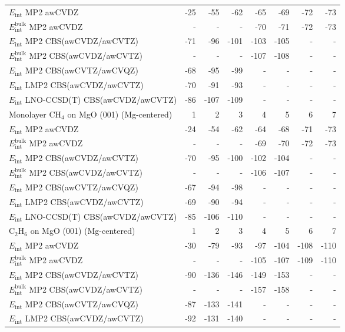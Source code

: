 \begin{longtable}{lrrrrrrr}
$E_\textrm{int}$ MP2 awCVDZ & -25 & -55 & -62 & -65 & -69 & -72 & -73 \\
$E_\textrm{int}^\textrm{bulk}$ MP2 awCVDZ & - & - & - & -70 & -71 & -72 & -73 \\
$E_\textrm{int}$ MP2 CBS(awCVDZ/awCVTZ) & -71 & -96 & -101 & -103 & -105 & - & - \\
$E_\textrm{int}^\textrm{bulk}$ MP2 CBS(awCVDZ/awCVTZ) & - & - & - & -107 & -108 & - & - \\
$E_\textrm{int}$ MP2 CBS(awCVTZ/awCVQZ) & -68 & -95 & -99 & - & - & - & - \\
$E_\textrm{int}$ LMP2 CBS(awCVDZ/awCVTZ) & -70 & -91 & -93 & - & - & - & - \\
$E_\textrm{int}$ LNO-CCSD(T) CBS(awCVDZ/awCVTZ) & -86 & -107 & -109 & - & - & - & - \\
\toprule
Monolayer CH$_4$ on MgO (001) (Mg-centered) & 1 & 2 & 3 & 4 & 5 & 6 & 7 \\ 
\midrule
$E_\textrm{int}$ MP2 awCVDZ & -24 & -54 & -62 & -64 & -68 & -71 & -73 \\
$E_\textrm{int}^\textrm{bulk}$ MP2 awCVDZ & - & - & - & -69 & -70 & -72 & -73 \\
$E_\textrm{int}$ MP2 CBS(awCVDZ/awCVTZ) & -70 & -95 & -100 & -102 & -104 & - & - \\
$E_\textrm{int}^\textrm{bulk}$ MP2 CBS(awCVDZ/awCVTZ) & - & - & - & -106 & -107 & - & - \\
$E_\textrm{int}$ MP2 CBS(awCVTZ/awCVQZ) & -67 & -94 & -98 & - & - & - & - \\
$E_\textrm{int}$ LMP2 CBS(awCVDZ/awCVTZ) & -69 & -90 & -94 & - & - & - & - \\
$E_\textrm{int}$ LNO-CCSD(T) CBS(awCVDZ/awCVTZ) & -85 & -106 & -110 & - & - & - & - \\
\toprule
C$_2$H$_6$ on MgO (001) (Mg-centered) & 1 & 2 & 3 & 4 & 5 & 6 & 7 \\ 
\midrule
$E_\textrm{int}$ MP2 awCVDZ & -30 & -79 & -93 & -97 & -104 & -108 & -110 \\
$E_\textrm{int}^\textrm{bulk}$ MP2 awCVDZ & - & - & - & -105 & -107 & -109 & -110 \\
$E_\textrm{int}$ MP2 CBS(awCVDZ/awCVTZ) & -90 & -136 & -146 & -149 & -153 & - & - \\
$E_\textrm{int}^\textrm{bulk}$ MP2 CBS(awCVDZ/awCVTZ) & - & - & - & -157 & -158 & - & - \\
$E_\textrm{int}$ MP2 CBS(awCVTZ/awCVQZ) & -87 & -133 & -141 & - & - & - & - \\
$E_\textrm{int}$ LMP2 CBS(awCVDZ/awCVTZ) & -92 & -131 & -140 & - & - & - & - \\

\end{longtable}
